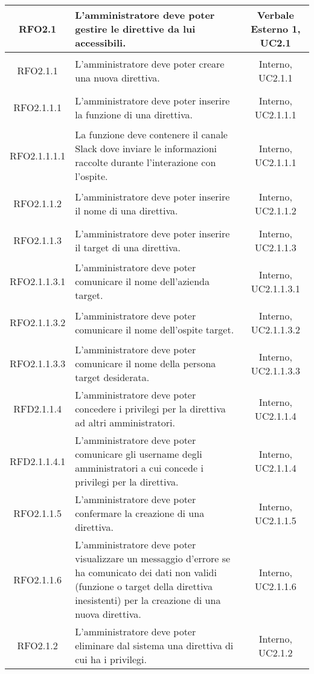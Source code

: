 \begin{longtable}{|c|>{\centering}m{7cm}|c|}
	\hypertarget{RFO2.1}{RFO2.1} & L'amministratore deve poter gestire le direttive da lui accessibili. & Verbale Esterno 1, UC2.1\\ \hline
	\hypertarget{RFO2.1.1}{RFO2.1.1} & L'amministratore deve poter creare una nuova direttiva. & Interno, UC2.1.1\\ \hline
	\hypertarget{RFO2.1.1.1}{RFO2.1.1.1} & L'amministratore deve poter inserire la funzione di una direttiva. & Interno, UC2.1.1.1\\ \hline
	\hypertarget{RFO2.1.1.1.1}{RFO2.1.1.1.1} & La funzione deve contenere il canale Slack dove inviare le informazioni raccolte durante l'interazione con l'ospite. & Interno, UC2.1.1.1\\ \hline
	\hypertarget{RFO2.1.1.2}{RFO2.1.1.2} & L'amministratore deve poter inserire il nome di una direttiva. & Interno, UC2.1.1.2\\ \hline
	\hypertarget{RFO2.1.1.3}{RFO2.1.1.3} & L'amministratore deve poter inserire il target di una direttiva. & Interno, UC2.1.1.3\\ \hline
	\hypertarget{RFO2.1.1.3.1}{RFO2.1.1.3.1} & L'amministratore deve poter comunicare il nome dell'azienda target. & Interno, UC2.1.1.3.1\\ \hline
	\hypertarget{RFO2.1.1.3.2}{RFO2.1.1.3.2} & L'amministratore deve poter comunicare il nome dell'ospite target. & Interno, UC2.1.1.3.2\\ \hline
	\hypertarget{RFO2.1.1.3.3}{RFO2.1.1.3.3} & L'amministratore deve poter comunicare il nome della persona target desiderata. & Interno, UC2.1.1.3.3\\ \hline
	\hypertarget{RFD2.1.1.4}{RFD2.1.1.4} & L'amministratore deve poter concedere i privilegi per la direttiva ad altri amministratori. & Interno, UC2.1.1.4\\ \hline
	\hypertarget{RFD2.1.1.4.1}{RFD2.1.1.4.1} & L'amministratore deve poter comunicare gli username degli amministratori a cui concede i privilegi per la direttiva. & Interno, UC2.1.1.4\\ \hline
	\hypertarget{RFO2.1.1.5}{RFO2.1.1.5} & L'amministratore deve poter confermare la creazione di una direttiva. & Interno, UC2.1.1.5\\ \hline
	\hypertarget{RFO2.1.1.6}{RFO2.1.1.6} & L'amministratore deve poter visualizzare un messaggio d'errore se ha comunicato dei dati non validi (funzione o target della direttiva inesistenti) per la creazione di una nuova direttiva. & Interno, UC2.1.1.6\\ \hline
	\hypertarget{RFO2.1.2}{RFO2.1.2} & L'amministratore deve poter eliminare dal sistema una direttiva di cui ha i privilegi. & Interno, UC2.1.2\\ \hline

\end{longtable}
